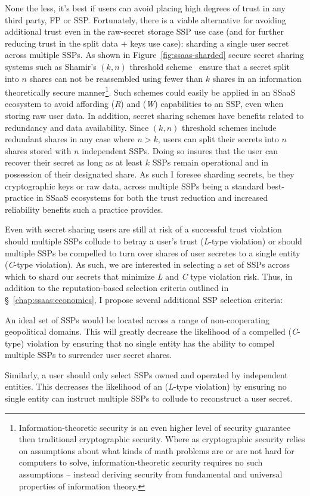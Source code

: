 None the less, it's best if users can avoid placing high degrees of
trust in any third party, FP or SSP. Fortunately, there is a viable
alternative for avoiding additional trust even in the raw-secret
storage SSP use case (and for further reducing trust in the split data
+ keys use case): sharding a single user secret across multiple
SSPs. As shown in Figure~\ref{fig:ssaas-sharded} secure secret sharing
systems such as Shamir's $(k, n)$ threshold scheme~\cite{shamir1979}
ensure that a secret split into $n$ shares can not be reassembled
using fewer than $k$ shares in an information theoretically secure
manner\footnote{Information-theoretic security is an even higher level
  of security guarantee then traditional cryptographic security. Where
  as cryptographic security relies on assumptions about what kinds of
  math problems are or are not hard for computers to solve,
  information-theoretic security requires no such assumptions --
  instead deriving security from fundamental and universal properties
  of information theory.}. Such schemes could easily be applied in an
SSaaS ecosystem to avoid affording (\emph{R}) and (\emph{W})
capabilities to an SSP, even when storing raw user data. In addition,
secret sharing schemes have benefits related to redundancy and data
availability. Since $(k, n)$ threshold schemes include redundant
shares in any case where $n > k$, users can split their secrets into
$n$ shares stored with $n$ independent SSPs. Doing so insures that the
user can recover their secret as long as at least $k$ SSPs remain
operational and in possession of their designated share. As such I
foresee sharding secrets, be they cryptographic keys or raw data,
across multiple SSPs being a standard best-practice in SSaaS
ecosystems for both the trust reduction and increased reliability
benefits such a practice provides.

Even with secret sharing users are still at risk of a successful trust
violation should multiple SSPs collude to betray a user's trust
(\emph{L}-type violation) or should multiple SSPs be compelled to turn
over shares of user secretes to a single entity (\emph{C}-type
violation). As such, we are interested in selecting a set of SSPs
across which to shard our secrets that minimize \emph{L} and \emph{C}
type violation risk. Thus, in addition to the reputation-based
selection criteria outlined in \S~\ref{chap:ssaas:economics}, I
propose several additional SSP selection criteria:

\begin{packed_desc}
\item[Geopolitical Diversity] An ideal set of SSPs would be located
  across a range of non-cooperating geopolitical domains. This will
  greatly decrease the likelihood of a compelled (\emph{C}-type)
  violation by ensuring that no single entity has the ability to
  compel multiple SSPs to surrender user secret shares.
\item[Ownership Diversity] Similarly, a user should only select SSPs
  owned and operated by independent entities. This decreases the
  likelihood of an (\emph{L}-type violation) by ensuring no single
  entity can instruct multiple SSPs to collude to reconstruct a user
  secret.
\end{packed_desc}

